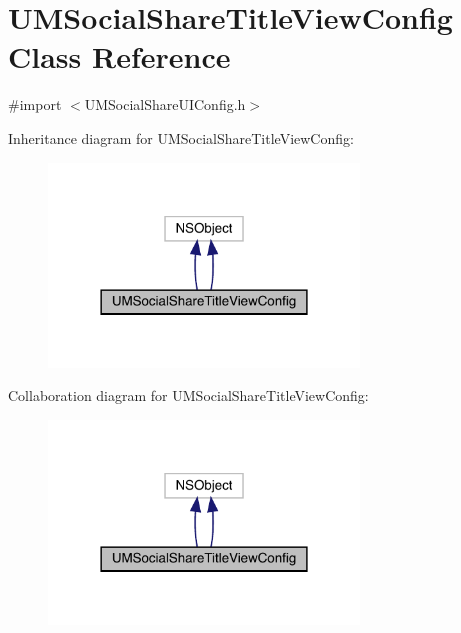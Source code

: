 \hypertarget{interface_u_m_social_share_title_view_config}{}\section{U\+M\+Social\+Share\+Title\+View\+Config Class Reference}
\label{interface_u_m_social_share_title_view_config}


{\ttfamily \#import $<$U\+M\+Social\+Share\+U\+I\+Config.\+h$>$}



Inheritance diagram for U\+M\+Social\+Share\+Title\+View\+Config\+:\nopagebreak
\begin{figure}[H]
\begin{center}
\leavevmode
\includegraphics[width=234pt]{interface_u_m_social_share_title_view_config__inherit__graph}
\end{center}
\end{figure}


Collaboration diagram for U\+M\+Social\+Share\+Title\+View\+Config\+:\nopagebreak
\begin{figure}[H]
\begin{center}
\leavevmode
\includegraphics[width=234pt]{interface_u_m_social_share_title_view_config__coll__graph}
\end{center}
\end{figure}
